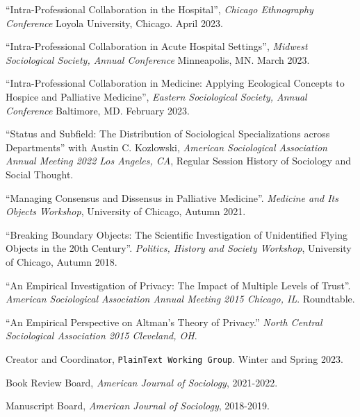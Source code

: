 \documentclass[11pt,article,oneside]{memoir}
\begin{document}
\ind ``Intra-Professional Collaboration in the Hospital'', \emph{Chicago Ethnography Conference} Loyola University, Chicago. April 2023. \vspace{0.05in}

\ind ``Intra-Professional Collaboration in Acute Hospital Settings'', \emph{Midwest Sociological Society, Annual Conference} Minneapolis, MN. March 2023. \vspace{0.05in}

\ind ``Intra-Professional Collaboration in Medicine: Applying Ecological Concepts to Hospice and Palliative Medicine'', \emph{Eastern Sociological Society, Annual Conference} Baltimore, MD. February 2023. \vspace{0.05in} 

\ind ``Status and Subfield: The Distribution of Sociological Specializations across Departments'' with Austin C. Kozlowski, \emph{American Sociological Association Annual Meeting 2022 Los Angeles, CA}, Regular Session History of Sociology and Social Thought. \vspace{0.005in}

\ind ``Managing Consensus and Dissensus in Palliative Medicine''. \emph{Medicine and Its Objects Workshop}, University of Chicago, Autumn 2021. \vspace{0.05in}

\ind ``Breaking Boundary Objects: The Scientific Investigation of Unidentified Flying Objects in the 20th Century''. \emph{Politics, History and Society Workshop}, University of Chicago,  Autumn 2018. \vspace{0.05in}

\ind ``An Empirical Investigation of Privacy: The Impact of Multiple Levels of Trust''. \emph{American Sociological Association Annual Meeting 2015 Chicago, IL}. Roundtable. {\vskip 5pt}

\ind ``An Empirical Perspective on Altman's Theory of Privacy.'' \emph{North Central Sociological Association 2015 Cleveland, OH}.

\normalsize

\medskip
{}
\medskip

\ind  Creator and Coordinator, \texttt{PlainText Working Group}. Winter and Spring 2023.

\ind Book Review Board, \emph{American Journal of Sociology}, 2021-2022.

\ind Manuscript Board, \emph{American Journal of Sociology}, 2018-2019.
\end{document}

